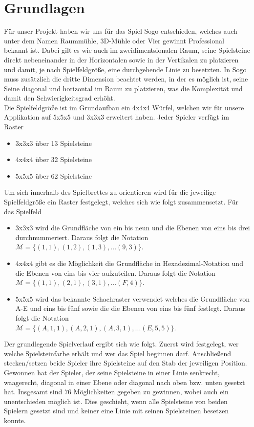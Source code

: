 \documentclass[a4paper]{scrartcl}
\begin{document}
\section{Grundlagen}\label{ch:Grundlagen}
Für unser Projekt haben wir uns für das Spiel Sogo entschieden, welches auch unter dem Namen Raummühle, 3D-Mühle oder Vier gewinnt Professional bekannt ist. Dabei gilt es wie auch im zweidimentsionalen Raum, seine Spielsteine direkt nebeneinander in der Horizontalen sowie in der Vertikalen zu platzieren und damit, je nach Spielfeldgröße, eine durchgehende Linie zu besetzten. In Sogo muss zusätzlich die dritte Dimension beachtet werden, in der es möglich ist, seine Seine diagonal und horizontal im Raum zu platzieren, was die Komplexität und damit den Schwierigkeitsgrad erhöht.
\\
Die Spielfeldgröße ist im Grundaufbau ein 4x4x4 Würfel, welchen wir für unsere Applikation auf 5x5x5 und 3x3x3 erweitert haben. 
Jeder Spieler verfügt im Raster
	\begin{itemize}
		\item 3x3x3 über 13 Spielsteine
		\item 4x4x4 über 32 Spielsteine		
		\item 5x5x5 über 62 Spielsteine
	\end{itemize}
Um sich innerhalb des Spielbrettes zu orientieren wird für die jeweilige Spielfeldgröße ein Raster festgelegt, welches sich wie folgt zusammensetzt. 
Für das Spielfeld
\begin{itemize}
		\item 3x3x3 wird die Grundfläche von ein bis neun und die Ebenen von 		eins bis drei durchnummeriert. Daraus folgt die Notation \\ $\mathcal{M}=\{(1,1),(1,2),(1,3),...(9,3)\}$.
		\item 4x4x4 gibt es die Möglichkeit die Grundfläche in Hexadezimal-Notation und die Ebenen von eins bis vier aufzuteilen. Daraus folgt die Notation \\
$\mathcal{M}=\{(1,1),(2,1),(3,1),...(F,4)\}$.
		\item 5x5x5 wird das bekannte Schachraster verwendet welches die Grundfläche von A-E und eins bis fünf sowie die die Ebenen von eins bis fünf festlegt. Daraus folgt die Notation \\
$\mathcal{M}=\{(A,1,1),(A,2,1),(A,3,1),...(E,5,5)\}$.
	\end{itemize}
	
Der grundlegende Spielverlauf ergibt sich wie folgt. Zuerst wird festgelegt, wer welche Spielsteinfarbe erhält und wer das Spiel beginnen darf. Anschließend stecken/setzen beide Spieler ihre Spielsteine auf den Stab der jeweiligen Position. Gewonnen hat der Spieler, der seine Spielsteine in einer Linie senkrecht, waagerecht, diagonal in einer Ebene oder diagonal nach oben bzw. unten gesetzt hat. Insgesamt sind 76 Möglichkeiten gegeben zu gewinnen, wobei auch ein unentschieden möglich ist. Dies geschieht, wenn alle Spielsteine von beiden Spielern gesetzt sind und keiner eine Linie mit seinen Spielsteinen besetzen konnte.
\end{document}
